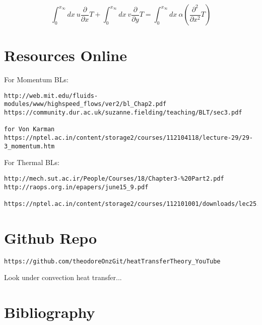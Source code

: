 \documentclass[11pt]{article}
\begin{document}
$$  \int_0^{x_\infty}  dx\ u \frac{\partial}{\partial x} T +  \int_0^{x_\infty}  dx\  v  \frac{\partial }{\partial y}  T  =  \int_0^{x_\infty}  dx\  \alpha (  \frac{\partial^2}{\partial x^2} T ) $$ 




\part{Resources Online}

For Momentum BLs:
\begin{verbatim}
http://web.mit.edu/fluids-modules/www/highspeed_flows/ver2/bl_Chap2.pdf
https://community.dur.ac.uk/suzanne.fielding/teaching/BLT/sec3.pdf

for Von Karman
https://nptel.ac.in/content/storage2/courses/112104118/lecture-29/29-3_momentum.htm
\end{verbatim}

For Thermal BLs:

\begin{verbatim}
http://mech.sut.ac.ir/People/Courses/18/Chapter3-%20Part2.pdf
http://raops.org.in/epapers/june15_9.pdf

https://nptel.ac.in/content/storage2/courses/112101001/downloads/lec25.pdf
\end{verbatim}

\part{Github Repo}
\begin{verbatim}
https://github.com/theodoreOnzGit/heatTransferTheory_YouTube
\end{verbatim}

Look under convection heat transfer...


\part{Bibliography}

\printbibliography
\end{document}
